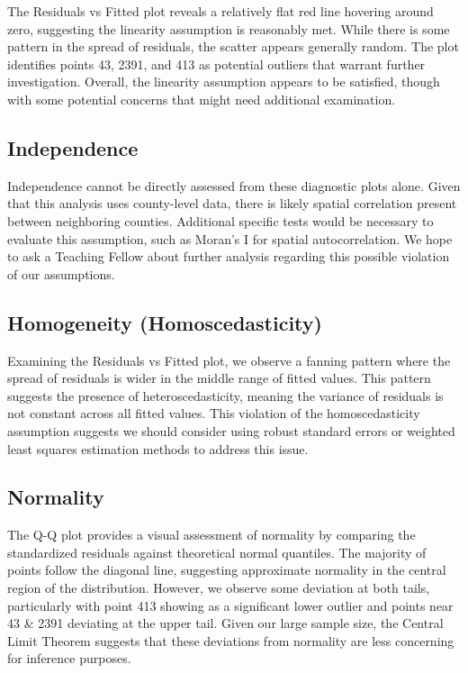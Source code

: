 \documentclass[
]{article}
\begin{document}
The Residuals vs Fitted plot reveals a relatively flat red line hovering
around zero, suggesting the linearity assumption is reasonably met.
While there is some pattern in the spread of residuals, the scatter
appears generally random. The plot identifies points 43, 2391, and 413
as potential outliers that warrant further investigation. Overall, the
linearity assumption appears to be satisfied, though with some potential
concerns that might need additional examination.

\subsection{Independence}\label{independence}

Independence cannot be directly assessed from these diagnostic plots
alone. Given that this analysis uses county-level data, there is likely
spatial correlation present between neighboring counties. Additional
specific tests would be necessary to evaluate this assumption, such as
Moran's I for spatial autocorrelation. We hope to ask a Teaching Fellow
about further analysis regarding this possible violation of our
assumptions.

\subsection{Homogeneity
(Homoscedasticity)}\label{homogeneity-homoscedasticity}

Examining the Residuals vs Fitted plot, we observe a fanning pattern
where the spread of residuals is wider in the middle range of fitted
values. This pattern suggests the presence of heteroscedasticity,
meaning the variance of residuals is not constant across all fitted
values. This violation of the homoscedasticity assumption suggests we
should consider using robust standard errors or weighted least squares
estimation methods to address this issue.

\subsection{Normality}\label{normality}

The Q-Q plot provides a visual assessment of normality by comparing the
standardized residuals against theoretical normal quantiles. The
majority of points follow the diagonal line, suggesting approximate
normality in the central region of the distribution. However, we observe
some deviation at both tails, particularly with point 413 showing as a
significant lower outlier and points near 43 \& 2391 deviating at the
upper tail. Given our large sample size, the Central Limit Theorem
suggests that these deviations from normality are less concerning for
inference purposes.
\end{document}
